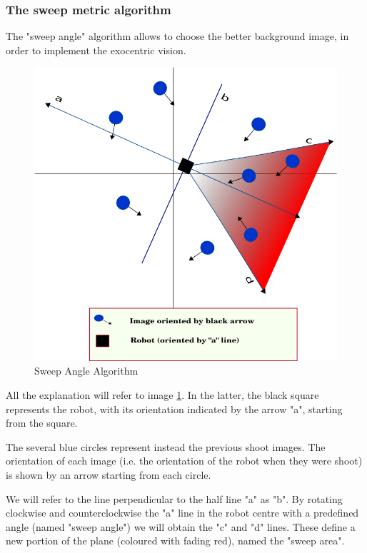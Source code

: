 \subsubsection{The sweep metric algorithm}
\label{subsec:sweep_metric_algorithm}
The "sweep angle" algorithm allows to choose the better background image, in order to implement
the exocentric vision.
%
\begin{figure}[!h]
  \begin{center}
    \includegraphics[width=400pt]{img/half_plan_finding.png} 
    \caption{Sweep Angle Algorithm}
    \label{fig:half_plan_finding}
  \end{center}
\end{figure}
%
All the explanation will refer to image \ref{fig:half_plan_finding}. In the latter, the black
square represents the robot, with its orientation indicated by the arrow "a", starting from the
square.
%

%
The several blue circles represent instead the previous shoot images. The orientation of each
image (i.e. the orientation of the robot when they were shoot) is shown by an arrow starting from
each circle.
%

%
We will refer to the line perpendicular to the half line "a" as "b". By rotating clockwise and
counterclockwise the "a" line in the robot centre with a predefined angle (named "sweep angle")
we will obtain the "c" and "d" lines. These define a new portion of the plane (coloured with fading red),
named the "sweep area".
%

